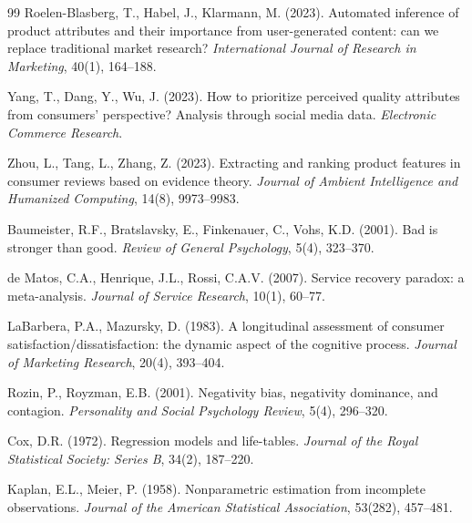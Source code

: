 \documentclass[11pt,a4paper]{article}
\begin{document}
\begin{thebibliography}{99}
Roelen-Blasberg, T., Habel, J., Klarmann, M. (2023).
Automated inference of product attributes and their importance from
user-generated content: can we replace traditional market research?
\textit{International Journal of Research in Marketing}, 40(1), 164--188.

Yang, T., Dang, Y., Wu, J. (2023).
How to prioritize perceived quality attributes from consumers' perspective?
Analysis through social media data.
\textit{Electronic Commerce Research}. %

Zhou, L., Tang, L., Zhang, Z. (2023).
Extracting and ranking product features in consumer reviews based on evidence
theory.
\textit{Journal of Ambient Intelligence and Humanized Computing}, 14(8),
9973--9983.


Baumeister, R.F., Bratslavsky, E., Finkenauer, C., Vohs, K.D. (2001).
Bad is stronger than good.
\textit{Review of General Psychology}, 5(4), 323--370.

de Matos, C.A., Henrique, J.L., Rossi, C.A.V. (2007).
Service recovery paradox: a meta-analysis.
\textit{Journal of Service Research}, 10(1), 60--77.

LaBarbera, P.A., Mazursky, D. (1983).
A longitudinal assessment of consumer satisfaction/dissatisfaction: the dynamic
aspect of the cognitive process.
\textit{Journal of Marketing Research}, 20(4), 393--404.

Rozin, P., Royzman, E.B. (2001).
Negativity bias, negativity dominance, and contagion.
\textit{Personality and Social Psychology Review}, 5(4), 296--320.


Cox, D.R. (1972).
Regression models and life-tables.
\textit{Journal of the Royal Statistical Society: Series B}, 34(2), 187--220.

Kaplan, E.L., Meier, P. (1958).
Nonparametric estimation from incomplete observations.
\textit{Journal of the American Statistical Association}, 53(282), 457--481.


\end{thebibliography}
\end{document}
